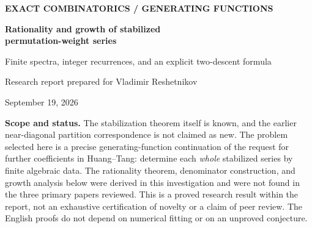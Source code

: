 \documentclass[11pt,letterpaper]{article}
\numberwithin{equation}{section}
\theoremstyle{definition}
\theoremstyle{remark}
\begin{document}
\thispagestyle{empty}
\begin{center}
  {\small\sffamily\bfseries\color{Olive}EXACT COMBINATORICS \quad / \quad GENERATING FUNCTIONS}\par
  \vspace{12pt}
  {\LARGE\bfseries Rationality and growth of stabilized\\[3pt]
  permutation-weight series}\par
  \vspace{9pt}
  {\large Finite spectra, integer recurrences, and an explicit two-descent formula}\par
  \vspace{12pt}
  {\sffamily Research report prepared for Vladimir Reshetnikov}\par
  \vspace{4pt}
  {\small September 19, 2026}
\end{center}
\vspace{8pt}
\begin{abstract}
The permutation-weight $q$-Eulerian polynomials have stabilized leading
coefficients $a_{d,k}$ when the number of descents $d$ is fixed. Earlier work
proved stabilization and investigated an initial agreement with the partition
triangle OEIS A256193. We pursue the complete-series problem: can the entire
series $W_d(t)=\sum_{k\ge0}a_{d,k}t^k$, including the coefficients beyond that
agreement, be described by a finite exact formula?

Starting from the published polynomial recurrence, we prove that every $W_d$
is rational. The key is a finite exponential spectrum indexed by partitions
of integers at most $d+1$. We give an explicit universal denominator, an
exact construction of the numerator, and a practical symbolic algorithm.
We also prove that the radius of convergence is exactly
$(d+1)^{-1/d}$, with a periodic leading asymptotic term. For $d=2$ we obtain
closed formulas involving only $3^m$, $2^m$, and Fibonacci numbers.
In contrast, the fixed-$d$ diagonal series of A256193 is nonrational and
has radius~$1$. Exact computations for $1\le d\le6$ are independently checked
against the original recurrence through deficit~$40$; the archive contains
all code, certificates, rational functions, and coefficient data.
\end{abstract}

\begin{resultbox}
\small
\textbf{Scope and status.}
The stabilization theorem itself is known, and the earlier near-diagonal
partition correspondence is not claimed as new. The problem selected here
is a precise generating-function continuation of the request for further
coefficients in Huang--Tang: determine each \emph{whole} stabilized series by
finite algebraic data. The rationality theorem, denominator construction,
and growth analysis below were derived in this investigation and were not
found in the three primary papers reviewed. This is a proved research
result within the report, not an exhaustive certification of novelty or a
claim of peer review. The English proofs do not depend on numerical fitting
or on an unproved conjecture.
\end{resultbox}
\end{document}
